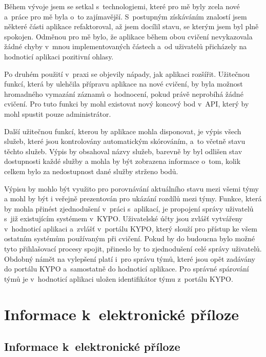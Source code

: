 \documentclass[
  digital,
  twoside,
  table, 
  nolof, 
  nolot
]{fithesis3}
\begin{document}
Během vývoje jsem se setkal s~technologiemi, které pro mě byly zcela nové a~práce pro mě byla o~to zajímavější. S~postupným získáváním znalostí jsem některé části aplikace refaktoroval, až jsem docílil stavu, se kterým jsem byl plně spokojen. Odměnou pro mě bylo, že aplikace během obou cvičení nevykazovala žádné chyby v~mnou implementovaných částech a~od uživatelů přicházely na hodnoticí aplikaci pozitivní ohlasy.

Po druhém použití v~praxi se objevily nápady, jak aplikaci rozšířit. Užitečnou funkcí, která by ulehčila přípravu aplikace na nové cvičení, by byla možnost hromadného vymazání záznamů o~hodnocení, pokud právě neprobíhá žádné cvičení. Pro tuto funkci by mohl existovat nový koncový bod v~API, který by mohl spustit pouze administrátor. 

Další užitečnou funkcí, kterou by aplikace mohla disponovat, je výpis všech služeb, které jsou kontrolovány automatickým skórováním, a~to včetně stavu těchto služeb. Výpis by obsahoval názvy služeb, barevně by byl odlišen stav dostupnosti každé služby a mohla by být zobrazena informace o~tom, kolik celkem bylo za nedostupnost dané služby strženo bodů.

Výpisu by mohlo být využito pro porovnávání aktuálního stavu mezi všemi týmy a mohl by být i veřejně prezentován pro ukázání rozdílů mezi týmy. Funkce, která by mohla přinést zjednodušení v~práci s~aplikací, je propojení správy uživatelů s~již existujícím systémem v~KYPO. Uživatelské účty jsou zvlášť vytvářeny v~hodnoticí aplikaci a~zvlášť v~portálu KYPO, který slouží pro přístup ke všem ostatním systémům používaným při cvičení. Pokud by do budoucna bylo možné tyto přihlašovací procesy spojit, přineslo by to zjednodušení celé správy uživatelů. Obdobný námět na vylepšení platí i~pro správu týmů, které jsou opět zadávány do portálu KYPO a~samostatně do hodnoticí aplikace. Pro správné spárování týmů je v~hodnoticí aplikaci uložen identifikátor týmu z~portálu KYPO.

\printbibliography[heading=bibintoc] %

\appendix %
\chapter{Informace k~elektronické příloze}


\section*{Informace k~elektronické příloze}
\end{document}
